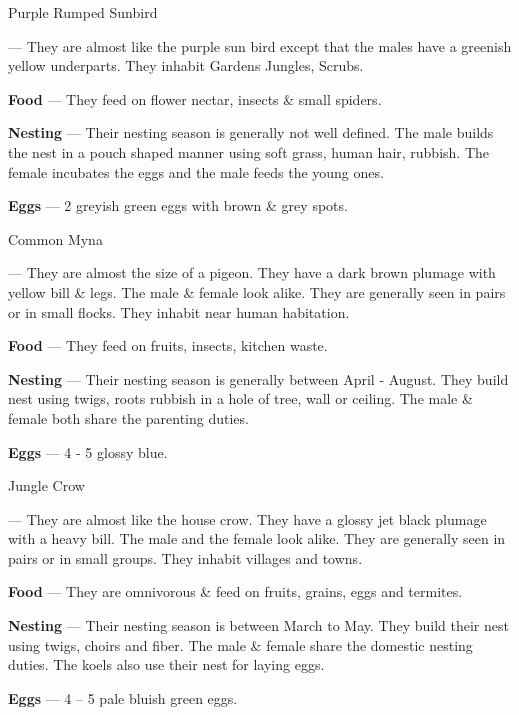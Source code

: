 \begin{bird}{Purple Rumped Sunbird}

 --- They are almost like the purple sun bird except that the males have a greenish yellow underparts. They inhabit Gardens Jungles, Scrubs.

{\large\bf Food} --- They feed on flower nectar, insects \& small spiders.

{\large\bf Nesting} --- Their nesting season is generally not well defined. The male builds the nest in a pouch shaped manner using soft grass, human hair, rubbish.  The female incubates the eggs and the male feeds the young ones.

{\large\bf Eggs} --- 2 greyish green eggs with brown \& grey spots.
\end{bird}

\begin{bird}{Common Myna}

 --- They are almost the size of a pigeon. They have a dark brown plumage with yellow bill \& legs. The male \& female look alike. They are generally seen in pairs or in small flocks. They inhabit near human habitation.

{\large\bf Food} --- They feed on fruits, insects, kitchen waste. 

{\large\bf Nesting} --- Their nesting season is generally between April - August. They build nest using twigs, roots rubbish in a hole of tree, wall or ceiling. The male \& female both share the parenting duties.

{\large\bf Eggs} --- 4 - 5 glossy blue.
\end{bird}

\begin{bird}{Jungle Crow}

 --- They are almost like the house crow. They have a glossy jet black plumage with a heavy bill. The male and the female look alike. They are generally seen in pairs or in small groups. They inhabit villages and towns. 

{\large\bf Food} --- They are omnivorous \& feed on fruits, grains, eggs and termites.

{\large\bf Nesting} --- Their nesting season is between March to May. They build their nest using twigs, choirs and fiber. The male \& female share the domestic nesting duties. The koels also use their nest for laying eggs. 

{\large\bf Eggs} --- 4 -- 5 pale bluish green eggs.
\end{bird}

